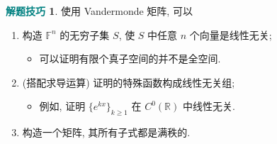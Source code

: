 \documentclass[11pt]{ctexart}
\theoremstyle{definition}
\numberwithin{equation}{section}
\theoremstyle{definition}
\newtheorem*{trick}{\textcolor{teal}{解题技巧}}
\theoremstyle{remark}
\begin{document}
\begin{trick}
    使用 Vandermonde 矩阵, 可以
    \begin{enumerate}
        \item 构造 $\mathbb F^n$ 的无穷子集 $S$, 使 $S$ 中任意 $n$ 个向量是线性无关; 
        \begin{itemize}
            \item 可以证明有限个真子空间的并不是全空间. 
        \end{itemize}
        \item (搭配求导运算) 证明的特殊函数构成线性无关组; 
        \begin{itemize}
            \item 例如, 证明 $\{e^{kx}\}_{k\geq 1}$ 在 $C^0(\mathbb R)$ 中线性无关. 
        \end{itemize}
        \item 构造一个矩阵, 其所有子式都是满秩的. 
    \end{enumerate}
\end{trick}
\end{document}
